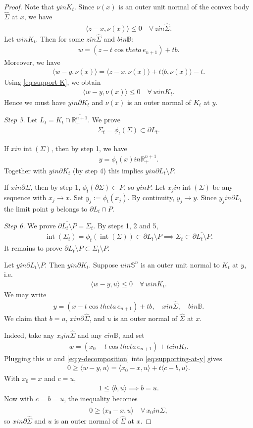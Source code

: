 \documentclass[12pt]{amsart}
\def\theta{theta}%
\def\in{in }%
\numberwithin{equation}{section}
\newcommand{\wh}{\widehat}
\newcommand{\ov}{\overline}
\newcommand{\bbR}{\mathbb{R}}
\newcommand{\bbS}{\mathbb{S}}
\newcommand{\bbB}{\mathbb{B}}
\newcommand{\op}[1]{\operatorname{#1}}
\newcommand{\8}{\infty}
\newcommand{\Si}{\Sigma}
\newcommand{\ip}[2]{\langle #1,#2 \rangle}
\newcommand{\eq}[1]{\begin{equation}\begin{alignedat}{2}#1\end{alignedat}\end{equation}}
\begin{document}
\begin{proof}
Note that $y\in K_t$. Since $\nu(x)$ is an outer unit normal of the convex body $\widehat{\Sigma}$ at $x$, we have
\eq{\label{eq:support-K}
  \ip{z-x}{\nu(x)}\le 0\quad\forall\,z\in \widehat{\Sigma}.
}
Let $w\in K_t$. Then for some $z\in \widehat{\Sigma}$ and $b\in\bbB$:
\eq{
  w=(z-t\cos\theta\,e_{n+1})+tb.
}
Moreover, we have
\eq{
  \ip{w-y}{\nu(x)} = \ip{z-x}{\nu(x)} + t\ip{b}{\nu(x)} - t.
}
Using \eqref{eq:support-K}, we obtain
\eq{
  \ip{w-y}{\nu(x)}\le 0\quad\forall\,w\in K_t.
}
Hence we must have $y\in\partial K_t$ and $\nu(x)$ is an outer normal of $K_t$ at $y$.

\emph{Step 5.} Let $L_t=K_t\cap\ov{\bbR^{n+1}_+}$.
We prove
\eq{
  \Sigma_t=\phi_t(\Sigma)\subset\partial L_t.
}

If  $x\in\op{int}(\Sigma)$, then by step 1, we have
\eq{
  y=\phi_t(x)\in\bbR^{n+1}_+.
}
Together with $y\in\partial K_t$ (by step 4) this implies $y\in\partial L_t\setminus P$.

If  $x\in\partial\Sigma$, then by step 1, $\phi_t(\partial\Sigma)\subset P$, so $y\in P$.
Let $x_j\in\op{int}(\Sigma)$ be any sequence with $x_j\to x$. Set $y_j:=\phi_t(x_j)$. By continuity, $y_j\to y$.
Since $y_j\in \partial L_t$ the limit point $y$ belongs to $\partial L_t\cap P$.

\emph{Step 6.}
We prove $ \ov{\partial L_t\setminus P}= \Sigma_t$. By steps 1, 2 and 5,
\eq{
  \op{int}(\Si_t)=\phi_t(\op{int}(\Si))\subset\partial L_t\setminus P\implies \Sigma_t \subset \ov{\partial L_t\setminus P}.
}
It remains to prove $\partial L_t\setminus P \subset \Sigma_t\setminus P$.


Let $y\in\partial L_t\setminus P$. Then $y\in\partial K_t$. Suppose $u\in\bbS^n$ is an outer unit normal to $K_t$ at $y$, i.e.
\eq{\label{eq:supporting-at-y}
  \ip{w-y}{u}\le 0\quad\forall\,w\in K_t.
}
We may write
\eq{\label{eq:y-decomposition}
  y=(x-t\cos\theta\,e_{n+1})+tb,
  \quad x\in \widehat{\Sigma},\quad b\in\bbB.
}
We claim that $b=u$, $x\in \partial \wh{\Si}$, and $u$ is an outer normal of $\widehat{\Sigma}$ at $x$. 

Indeed, take any $x_0\in \widehat{\Sigma}$ and any $c\in\bbB$, and set
\eq{
  w=(x_0-t\cos\theta\,e_{n+1})+tc\in K_t.
}
Plugging this $w$ and \eqref{eq:y-decomposition} into \eqref{eq:supporting-at-y} gives
\eq{
  0\ge \ip{w-y}{u}
  =\ip{x_0-x}{u}+t\ip{c-b}{u}.
}
With $x_0=x$ and $c=u$,
\eq{
  1\le \ip{b}{u}\implies b=u.
}
Now with $c=b=u$, the inequality becomes
\eq{
  0\ge \ip{x_0-x}{u}\quad\forall\,x_0\in \widehat{\Sigma},
}
so $x\in \partial \wh{\Si}$ and $u$ is an outer normal of $\widehat{\Sigma}$ at $x$.


\end{proof}
\end{document}
